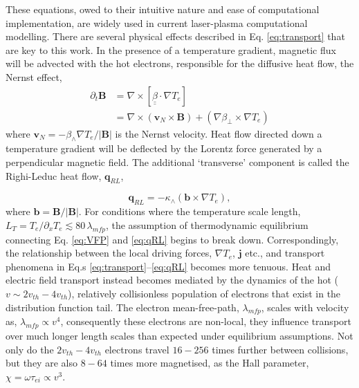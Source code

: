 \documentclass[aip,reprint]{revtex4-1}
\begin{document}
These equations, owed to their intuitive nature and ease of computational implementation, are widely used in current laser-plasma computational modelling. There are several physical effects described in Eq. \ref{eq:transport} that are key to this work. In the presence of a temperature gradient, magnetic flux will be advected with the hot electrons, responsible for the diffusive heat flow, the Nernst effect,
\begin{eqnarray}
\partial_t \mathbf{B} &= \nabla \times \left[\underline{\underline{\beta}} \cdot \nabla T_e \right] \\
&=\nabla \times (\mathbf{v}_N \times \mathbf{B})  +  \left(  \nabla \beta_{\perp} \times \nabla T_e\right )
\label{eq:Nernst}
\end{eqnarray}
where $\mathbf{v}_N = - \beta_{\wedge} \nabla T_e/|\mathbf{B}|$ is the Nernst velocity.
 Heat flow directed down a temperature gradient will be deflected by the Lorentz force generated by a perpendicular magnetic field. The additional `transverse' component is called the Righi-Leduc heat flow, $\mathbf{q}_{RL}$,
 
\begin{equation}
\mathbf{q}_{RL}  =-\kappa_{\wedge}(\mathbf{b}\times \nabla T_e), 
\label{eq:qRL}
\end{equation}
where $\mathbf{b} = \mathbf{B}/|\mathbf{B}|$. For conditions where the temperature scale length, $L_{T} = T_e/\partial_x T_e \lesssim 80 \, \lambda_{mfp}$, the assumption of thermodynamic equilibrium connecting Eq. \ref{eq:VFP} and \ref{eq:qRL} begins to break down.  Correspondingly, the relationship between the local driving forces, $\nabla T_e$, $\mathbf{j}$  etc., and transport phenomena in Eq.s \ref{eq:transport}--\ref{eq:qRL} becomes more tenuous.  Heat and electric field transport instead becomes mediated by the dynamics of the hot ($v\sim 2\si{v_{th}} - 4\si{v_{th}}$), relatively collisionless population of electrons that exist in the distribution function tail. The electron mean-free-path, $\lambda_{mfp}$, scales with velocity as, $\lambda_{mfp} \propto v^4$, consequently these electrons are non-local, they influence transport over much longer length scales than expected under equilibrium assumptions. Not only do the $2\si{v_{th}} - 4\si{v_{th}}$ electrons travel $16-256$ times further between collisions, but they are also $8-64$ times more magnetised, as the Hall parameter, $\chi = \omega \tau_{ei}\propto v^3$.  
 
\end{document}
